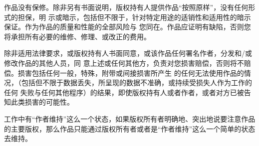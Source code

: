 \begin{LPPLicense}
    \label{LPPL:Warranty}


    作品没有保修。除非另有书面说明，版权持有人提供作品``按照原样''，没有任何形式的担保，明 示或暗示，包括但不限于，针对特定用途的适销性和适用性的暗示保证。作为作品的质量和性能的全部风险与 您同在。作品应证明有缺陷，否则您将承担所有必要的维修、修理、或改正的费用。


    除非适用法律要求，或版权持有人书面同意，或该作品任何署名作者，分发和/或修改作品的其他人员，同 意上述或任何其他方，负责对您损害赔偿，否则将不赔偿。损害包括任何一般，特殊，附带或间接损害所产生 的任何无法使用作品的情况，（包括但不限于数据丢失，所呈现的数据不准确，或持续受损失人作为工作的任何 失败与任何其他程序）的结果，即使版权持有人或者作者，或者对方已被告知此类损害的可能性。


    \label{LPPL:Maintenance}


    工作中有``作者维持''这么一个状态，如果版权所有者明确地、突出地说要注意作品的主要版权，那么作品只能通过版权所有者或者是``作者维持''这么一个简单的状态去维持。


\end{LPPLicense}
